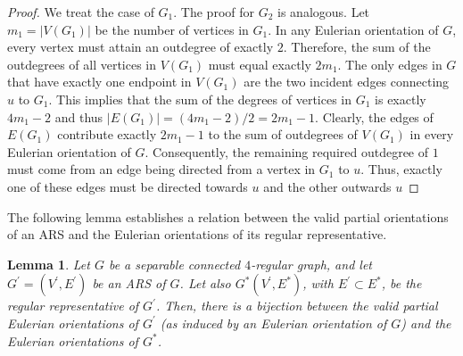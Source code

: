 \documentclass{article}
\newtheorem{lemma}{Lemma}
\begin{document}
        \begin{proof}
            We treat the case of $G_1$.
            The proof for $G_2$ is analogous.
            Let $m_1 = |V(G_1)|$ be the number of vertices in $G_1$.
            In any Eulerian orientation of $G$, every vertex must attain an outdegree of exactly $2$.
            Therefore, the sum of the outdegrees of all vertices in $V(G_1)$ must equal exactly $2m_1$.
            The only edges in $G$ that have exactly one endpoint in $V(G_1)$ are the two incident edges connecting $u$ to $G_1$.
            This implies that the sum of the degrees of vertices in $G_1$ is exactly $4m_1-2$ and thus $|E(G_1)|=(4m_1 - 2) / 2 = 2m_1 - 1$. 
            Clearly, the edges of $E(G_1)$ contribute exactly $2m_1 - 1$ to the sum of outdegrees of $V(G_1)$ in every Eulerian orientation of $G$.
            Consequently, the remaining required outdegree of $1$ must come from an edge being directed from a vertex in $G_1$ to $u$.
            Thus,  exactly one of these edges must be directed towards $u$ and the other outwards $u$
        \end{proof}
        
        The following lemma establishes a relation between the valid partial orientations of an ARS and the Eulerian orientations of its regular representative.
        
        \begin{lemma}\label{lem:ARS}
            Let $G$ be  a separable connected $4$-regular graph, and let $G^\prime=(V^\prime,E^\prime)$ be an ARS of $G$.
            Let also $G^*(V^\prime,E^*)$, with $E^\prime \subset E^*$, be the regular representative of $G^\prime$.
            Then, there is a bijection between the valid partial Eulerian orientations of $G^\prime$ (as induced by an Eulerian orientation of $G$) and the Eulerian orientations of $G^*$.
            \end{lemma}
            
\end{document}
